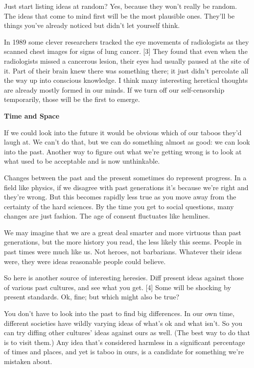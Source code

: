 Just start listing ideas at random? Yes, because they won't really be
random. The ideas that come to mind first will be the most plausible
ones. They'll be things you've already noticed but didn't let yourself
think.

In 1989 some clever researchers tracked the eye movements of
radiologists as they scanned chest images for signs of lung cancer.
{[}3{]} They found that even when the radiologists missed a cancerous
lesion, their eyes had usually paused at the site of it. Part of their
brain knew there was something there; it just didn't percolate all the
way up into conscious knowledge. I think many interesting heretical
thoughts are already mostly formed in our minds. If we turn off our
self-censorship temporarily, those will be the first to emerge.

\textbf{Time and Space}

If we could look into the future it would be obvious which of our taboos
they'd laugh at. We can't do that, but we can do something almost as
good: we can look into the past. Another way to figure out what we're
getting wrong is to look at what used to be acceptable and is now
unthinkable.

Changes between the past and the present sometimes do represent
progress. In a field like physics, if we disagree with past generations
it's because we're right and they're wrong. But this becomes rapidly
less true as you move away from the certainty of the hard sciences. By
the time you get to social questions, many changes are just fashion. The
age of consent fluctuates like hemlines.

We may imagine that we are a great deal smarter and more virtuous than
past generations, but the more history you read, the less likely this
seems. People in past times were much like us. Not heroes, not
barbarians. Whatever their ideas were, they were ideas reasonable people
could believe.

So here is another source of interesting heresies. Diff present ideas
against those of various past cultures, and see what you get. {[}4{]}
Some will be shocking by present standards. Ok, fine; but which might
also be true?

You don't have to look into the past to find big differences. In our own
time, different societies have wildly varying ideas of what's ok and
what isn't. So you can try diffing other cultures' ideas against ours as
well. (The best way to do that is to visit them.) Any idea that's
considered harmless in a significant percentage of times and places, and
yet is taboo in ours, is a candidate for something we're mistaken about.

